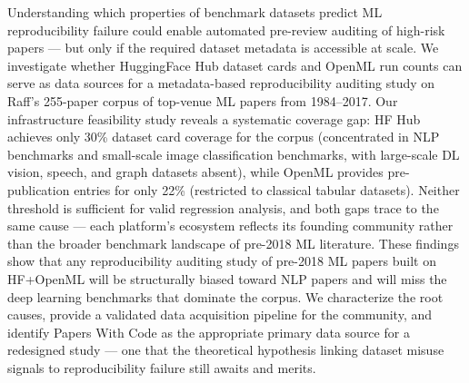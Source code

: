 Understanding which properties of benchmark datasets predict ML reproducibility failure could enable automated pre-review auditing of high-risk papers --- but only if the required dataset metadata is accessible at scale. We investigate whether HuggingFace Hub dataset cards and OpenML run counts can serve as data sources for a metadata-based reproducibility auditing study on Raff's 255-paper corpus of top-venue ML papers from 1984--2017. Our infrastructure feasibility study reveals a systematic coverage gap: HF Hub achieves only 30\% dataset card coverage for the corpus (concentrated in NLP benchmarks and small-scale image classification benchmarks, with large-scale DL vision, speech, and graph datasets absent), while OpenML provides pre-publication entries for only 22\% (restricted to classical tabular datasets). Neither threshold is sufficient for valid regression analysis, and both gaps trace to the same cause --- each platform's ecosystem reflects its founding community rather than the broader benchmark landscape of pre-2018 ML literature. These findings show that any reproducibility auditing study of pre-2018 ML papers built on HF+OpenML will be structurally biased toward NLP papers and will miss the deep learning benchmarks that dominate the corpus. We characterize the root causes, provide a validated data acquisition pipeline for the community, and identify Papers With Code as the appropriate primary data source for a redesigned study --- one that the theoretical hypothesis linking dataset misuse signals to reproducibility failure still awaits and merits.
